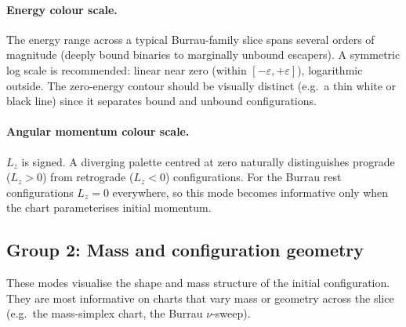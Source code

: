 \documentclass[11pt]{article}
\begin{document}
\paragraph{Energy colour scale.} The energy range across a typical Burrau-family
slice spans several orders of magnitude (deeply bound binaries to marginally
unbound escapers). A symmetric log scale is recommended: linear near zero
(within $[-\varepsilon, +\varepsilon]$), logarithmic outside. The zero-energy
contour should be visually distinct (e.g.\ a thin white or black line) since it
separates bound and unbound configurations.

\paragraph{Angular momentum colour scale.} $L_z$ is signed. A diverging palette
centred at zero naturally distinguishes prograde ($L_z > 0$) from retrograde
($L_z < 0$) configurations. For the Burrau rest configurations $L_z = 0$
everywhere, so this mode becomes informative only when the chart parameterises
initial momentum.

\subsection{Group 2: Mass and configuration geometry}

These modes visualise the shape and mass structure of the initial configuration.
They are most informative on charts that vary mass or geometry across the slice
(e.g.\ the mass-simplex chart, the Burrau $\nu$-sweep).
\end{document}
